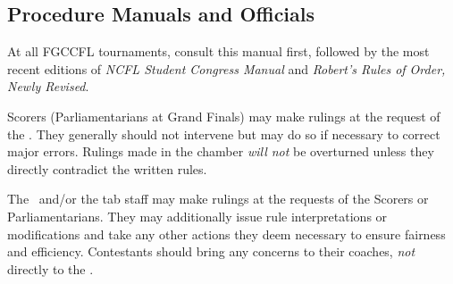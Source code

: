 \subsection{Procedure Manuals and Officials}
At all FGCCFL tournaments, consult this manual first, 
followed by the most recent editions of \emph{NCFL Student Congress Manual} 
and \emph{Robert's Rules of Order, Newly Revised}.

Scorers (Parliamentarians at Grand Finals) may make rulings at the request of the \po. 
They generally should not intervene but may do so if necessary to correct major errors. 
Rulings made in the chamber \emph{will not} be overturned unless they directly contradict 
the written rules.

The \cd\ and/or the tab staff may make rulings at the requests of the Scorers or Parliamentarians. 
They may additionally issue rule interpretations or modifications and take any other actions they 
deem necessary to ensure fairness and efficiency.
Contestants should bring any concerns to their coaches, \emph{not} directly to the \cd.